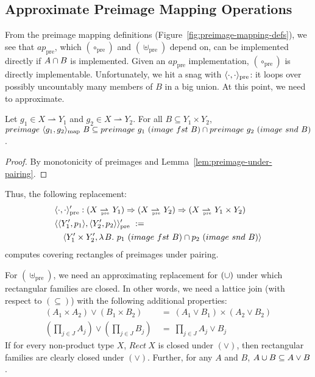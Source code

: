 \documentclass[preprint]{sigplanconf}
\newcommand{\pto}{\rightharpoonup}
\newcommand{\join}{\vee}
\newcommand{\map}{_\mathrm{map}}
\newcommand{\pre}{_\mathrm{pre}}
\newcommand{\prepto}{\pto_{\mspace{-19mu}\pre}}
\begin{document}
\subsection{Approximate Preimage Mapping Operations}

From the preimage mapping definitions (Figure~\ref{fig:preimage-mapping-defs}), we see that $ap\pre$, which $(\circ\pre)$ and $(\uplus\pre)$ depend on, can be implemented directly if $A \cap B$ is implemented.
Given an $ap\pre$ implementation, $(\circ\pre)$ is directly implementable.
Unfortunately, we hit a snag with $\pair{\cdot,\cdot}\pre$: it loops over possibly uncountably many members of $B$ in a big union.
At this point, we need to approximate.

\begin{theorem}
Let $g_1 \in X \pto Y_1$ and $g_2 \in X \pto Y_2$.
For all $B \subseteq Y_1 \times Y_2$, $preimage~\pair{g_1,g_2}\map~B \subseteq preimage~g_1~(image~fst~B) \i preimage~g_2~(image~snd~B)$.
\end{theorem}
\begin{proof}
By monotonicity of preimages and Lemma~\ref{lem:preimage-under-pairing}.
\end{proof}

Thus, the following replacement:
\begin{equation}
\begin{aligned}
	&\pair{\cdot,\cdot}\pre' : (X \prepto Y_1) \tto (X \prepto Y_2) \tto (X \prepto Y_1 \times Y_2) \\
	&\pair{\pair{Y_1',p_1},\pair{Y_2',p_2}}\pre' \ := \ \\
	&\tab\pair{Y_1' \times Y_2',\fun{B}{p_1~(image~fst~B) \i p_2~(image~snd~B)}}
\end{aligned}
\end{equation}
computes covering rectangles of preimages under pairing.

For $(\uplus\pre)$, we need an approximating replacement for $(\cup)$ under which rectangular families are closed.
In other words, we need a lattice join (with respect to $(\subseteq)$) with the following additional properties:
\begin{equation}
\begin{aligned}
	(A_1 \times A_2) \join (B_1 \times B_2) &\ = \ (A_1 \join B_1) \times (A_2 \join B_2) \\
	(\textstyle\prod_{j \in J} A_j) \join (\textstyle\prod_{j \in J} B_j) &\ = \ \textstyle\prod_{j \in J} A_j \join B_j
\label{eqn:join-laws}
\end{aligned}
\end{equation}
If for every non-product type $X$, $Rect~X$ is closed under $(\join)$, then rectangular families are clearly closed under $(\join)$. Further, for any $A$ and $B$, $A \u B \subseteq A \join B$.
\end{document}
